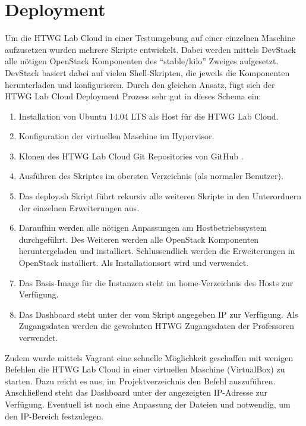 \chapter{Deployment}

Um die HTWG Lab Cloud in einer Testumgebung auf einer einzelnen Maschine aufzusetzen wurden mehrere  Skripte entwickelt.
Dabei werden mittels DevStack \cite{devstack} alle nötigen OpenStack Komponenten des \enquote{stable/kilo} Zweiges aufgesetzt.
DevStack basiert dabei auf vielen Shell-Skripten, die jeweils die Komponenten herunterladen und konfigurieren.
Durch den gleichen Ansatz, fügt sich der HTWG Lab Cloud Deployment Prozess sehr gut in dieses Schema ein:

\begin{enumerate}
\item Installation von Ubuntu 14.04 LTS als Host für die HTWG Lab Cloud.
\item Konfiguration der virtuellen Maschine im Hypervisor.
\item Klonen des HTWG Lab Cloud Git Repositories von GitHub \cite{git-source}.
\item Ausführen des  Skriptes im obersten Verzeichnis (als normaler Benutzer).
\item Das deploy.sh Skript führt rekursiv alle weiteren Skripte in den Unterordnern der einzelnen Erweiterungen aus.
\item Daraufhin werden alle nötigen Anpassungen am Hostbetriebssystem durchgeführt.  Des Weiteren werden alle OpenStack Komponenten heruntergeladen und installiert. Schlussendlich werden die Erweiterungen in OpenStack installiert. Als Installationsort wird  und  verwendet.
\item Das Basis-Image für die Instanzen steht im home-Verzeichnis des Hosts zur Verfügung.
\item Das Dashboard steht unter der vom Skript angegeben IP zur Verfügung. Als Zugangsdaten werden die gewohnten HTWG Zugangsdaten der Professoren verwendet.
\end{enumerate}

Zudem wurde mittels Vagrant \cite{Vagrant} eine schnelle Möglichkeit geschaffen mit wenigen Befehlen die HTWG Lab Cloud in einer virtuellen Maschine (VirtualBox) zu starten. 
Dazu reicht es aus, im Projektverzeichnis den Befehl  auszuführen.
Anschließend steht das Dashboard unter der angezeigten IP-Adresse zur Verfügung.
Eventuell ist noch eine Anpassung der Dateien  und  notwendig, um den IP-Bereich festzulegen.

